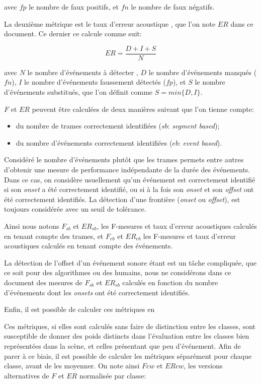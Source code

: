 avec $fp$ le nombre de faux positifs, et $fn$ le nombre de faux négatifs.


La deuxième métrique est le taux d'erreur acoustique \citep{poliner2007discriminative,clear}, que l'on note $ER$ dans ce document. Ce dernier ce calcule comme suit:

\begin{equation}
ER=\dfrac{D+I+S}{N}
\end{equation}

avec $N$ le nombre d'événements à détecter , $D$ le nombre d'événements manqués ($fn$), $I$ le nombre d'événements faussement détectés ($fp$), et $S$ le nombre d'événements substitués, que l'on définit comme $S=min\lbrace D,I\rbrace$.

$F$ et $ER$ peuvent être calculées de deux manières suivant que l'on tienne compte: 

\begin{itemize}
\item du nombre de trames correctement identifiées ($sb$: \emph{segment based});
\item du nombre d'événements correctement identifiées ($eb$: \emph{event based}).
\end{itemize}

Considéré le nombre d'événements plutôt que les trames permets entre autres d'obtenir une mesure de performance indépendante de la durée des événements. Dans ce cas, on considère usuellement qu'un événement est correctement identifié si son \emph{onset} a été correctement identifié, ou si à la fois son \emph{onset} et son \emph{offset} ont été correctement identifiés. La détection d'une frontière (\emph{onset} ou \emph{offset}), est toujours considérée avec un seuil de tolérance.

Ainsi nous notons $F_{sb}$ et $ER_{sb}$, les F-mesures et taux d'erreur acoustiques calculés en tenant compte des trames, et $F_{eb}$ et $ER_{eb}$ les F-mesures et taux d'erreur acoustiques calculés en tenant compte des événements.

La détection de l'offset d'un événement sonore étant est un tâche compliquée, que ce soit pour des algorithmes ou des humains, nous ne considérons dans ce document des mesures de $F_{sb}$ et $ER_{sb}$ calculés en fonction du nombre d'événements dont les \emph{onsets} ont été correctement identifiés.

Enfin, il est possible de calculer ces métriques en 

Ces métriques, si elles sont calculés sans faire de distinction entre les classes, sont susceptible de donner des poids distincts dans l'évaluation entre les classes bien représentées dans la scène, et celles présentant que peu d'événement. Afin de parer à ce biais, il est possible de calculer les métriques séparément pour chaque classe, avant de les moyenner. On note ainsi $Fcw$ et $ERcw$, les versions alternatives de $F$ et $ER$ normalisée par classe:

